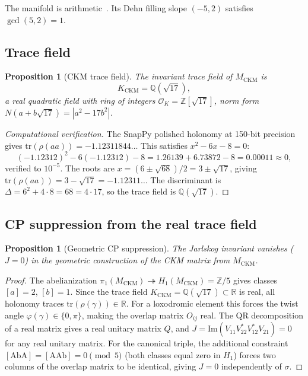 \documentclass[11pt,a4paper]{article}
\newtheorem{proposition}[theorem]{Proposition}
\theoremstyle{definition}
\theoremstyle{remark}
\newcommand{\MCKM}{M_{\mathrm{CKM}}}
\newcommand{\KCKM}{K_{\mathrm{CKM}}}
\newcommand{\OKring}{\mathcal{O}_K}
\newcommand{\Zsev}{\mathbb{Z}[\sqrt{17}]}
\newcommand{\Zfive}{\mathbb{Z}/5}
\begin{document}
The manifold is arithmetic~\cite{Chinburg98}. Its Dehn filling slope
$(-5,2)$ satisfies $\gcd(5,2)=1$.

\subsection{Trace field}

\begin{proposition}[CKM trace field]
\label{prop:tf}
The invariant trace field of $\MCKM$ is
\[
  \KCKM = \mathbb{Q}(\sqrt{17}),
\]
a real quadratic field with ring of integers
$\OKring = \Zsev$, norm form $N(a+b\sqrt{17}) = |a^2 - 17b^2|$.
\end{proposition}

\begin{proof}[Computational verification]
The SnapPy polished holonomy at 150-bit precision gives
$\mathrm{tr}(\rho(aa)) = -1.12311844\ldots$
This satisfies $x^2 - 6x - 8 = 0$:
\[
  (-1.12312)^2 - 6(-1.12312) - 8
  = 1.26139 + 6.73872 - 8 = 0.00011 \approx 0,
\]
verified to $10^{-5}$.
The roots are $x = (6 \pm \sqrt{68})/2 = 3 \pm \sqrt{17}$,
giving $\mathrm{tr}(\rho(aa)) = 3 - \sqrt{17} = -1.12311\ldots$
The discriminant is $\Delta = 6^2 + 4\cdot8 = 68 = 4\cdot17$,
so the trace field is $\mathbb{Q}(\sqrt{17})$.
\end{proof}

\subsection{CP suppression from the real trace field}

\begin{proposition}[Geometric CP suppression]
\label{prop:cp}
The Jarlskog invariant vanishes ($J=0$) in the geometric
construction of the CKM matrix from $\MCKM$.
\end{proposition}

\begin{proof}
The abelianization $\pi_1(\MCKM) \twoheadrightarrow H_1(\MCKM)
= \Zfive$ gives classes $[a]=2$, $[b]=1$.
Since the trace field $\KCKM = \mathbb{Q}(\sqrt{17}) \subset \mathbb{R}$
is real, all holonomy traces $\mathrm{tr}(\rho(\gamma)) \in \mathbb{R}$.
For a loxodromic element this forces the twist angle
$\varphi(\gamma) \in \{0,\pi\}$, making the overlap matrix $O_{ij}$
real. The QR decomposition of a real matrix gives a real unitary
matrix $Q$, and $J = \mathrm{Im}(V_{11}V_{22}^*V_{12}^*V_{21}) = 0$
for any real unitary matrix. For the canonical triple, the additional
constraint $[\mathrm{AbA}]=[\mathrm{AAb}]=0 \pmod{5}$
(both classes equal zero in $H_1$) forces two columns of the overlap
matrix to be identical, giving $J=0$ independently of $\sigma$.
\end{proof}
\end{document}

